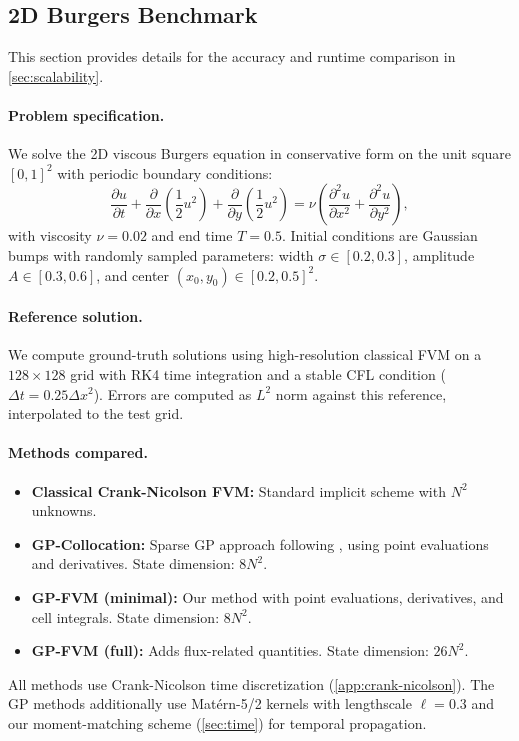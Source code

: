 \documentclass{article}
\theoremstyle{plain}
\theoremstyle{definition}
\theoremstyle{remark}
\begin{document}
\subsection{2D Burgers Benchmark}
\label{app:burgers-benchmark}

This section provides details for the accuracy and runtime comparison in \cref{sec:scalability}.

\paragraph{Problem specification.}
We solve the 2D viscous Burgers equation in conservative form on the unit square $[0,1]^2$ with periodic boundary conditions:
\begin{equation}
  \frac{\partial u}{\partial t} + \frac{\partial}{\partial x}\left(\frac{1}{2}u^2\right) + \frac{\partial}{\partial y}\left(\frac{1}{2}u^2\right) = \nu \left(\frac{\partial^2 u}{\partial x^2} + \frac{\partial^2 u}{\partial y^2}\right),
\end{equation}
with viscosity $\nu = 0.02$ and end time $T = 0.5$.
Initial conditions are Gaussian bumps with randomly sampled parameters: width $\sigma \in [0.2, 0.3]$, amplitude $A \in [0.3, 0.6]$, and center $(x_0, y_0) \in [0.2, 0.5]^2$.

\paragraph{Reference solution.}
We compute ground-truth solutions using high-resolution classical FVM on a $128 \times 128$ grid with RK4 time integration and a stable CFL condition ($\Delta t = 0.25 \Delta x^2$).
Errors are computed as $L^2$ norm against this reference, interpolated to the test grid.

\paragraph{Methods compared.}
\begin{itemize}[nosep]
  \item \textbf{Classical Crank-Nicolson FVM:} Standard implicit scheme with $N^2$ unknowns.
  \item \textbf{GP-Collocation:} Sparse GP approach following \citet{chenSparseCholeskyFactorization2025}, using point evaluations and derivatives. State dimension: $8N^2$.
  \item \textbf{GP-FVM (minimal):} Our method with point evaluations, derivatives, and cell integrals. State dimension: $8N^2$.
  \item \textbf{GP-FVM (full):} Adds flux-related quantities. State dimension: $26N^2$.
\end{itemize}
All methods use Crank-Nicolson time discretization (\cref{app:crank-nicolson}).
The GP methods additionally use Mat\'ern-5/2 kernels with lengthscale $\ell = 0.3$ and our moment-matching scheme (\cref{sec:time}) for temporal propagation.
\end{document}
